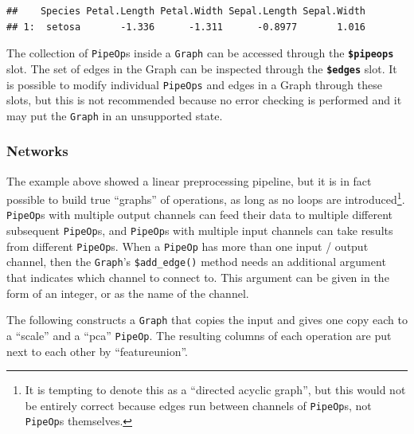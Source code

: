 \documentclass[]{scrbook}
\newenvironment{Shaded}{\begin{snugshade}}{\end{snugshade}}
\newcommand{\DecValTok}[1]{\textcolor[rgb]{0.00,0.00,0.81}{#1}}
\newcommand{\KeywordTok}[1]{\textcolor[rgb]{0.13,0.29,0.53}{\textbf{#1}}}
\newcommand{\NormalTok}[1]{#1}
\newcommand{\OperatorTok}[1]{\textcolor[rgb]{0.81,0.36,0.00}{\textbf{#1}}}
\renewenvironment{Shaded} {\begin{snugshade}\small} {\end{snugshade}}
\begin{document}
\begin{Shaded}
\end{Shaded}

\begin{verbatim}
##    Species Petal.Length Petal.Width Sepal.Length Sepal.Width
## 1:  setosa       -1.336      -1.311      -0.8977       1.016
\end{verbatim}

The collection of \texttt{PipeOp}s inside a \texttt{Graph} can be accessed through the \textbf{\texttt{\$pipeops}} slot.
The set of edges in the Graph can be inspected through the \textbf{\texttt{\$edges}} slot.
It is possible to modify individual \texttt{PipeOps} and edges in a Graph through these slots, but this is not recommended because no error checking is performed and it may put the \texttt{Graph} in an unsupported state.

\hypertarget{networks}{%
\subsubsection{Networks}\label{networks}}

The example above showed a linear preprocessing pipeline, but it is in fact possible to build true ``graphs'' of operations, as long as no loops are introduced\footnote{It is tempting to denote this as a ``directed acyclic graph'', but this would not be entirely correct because edges run between channels of \texttt{PipeOp}s, not \texttt{PipeOp}s themselves.}.
\texttt{PipeOp}s with multiple output channels can feed their data to multiple different subsequent \texttt{PipeOp}s, and \texttt{PipeOp}s with multiple input channels can take results from different \texttt{PipeOp}s.
When a \texttt{PipeOp} has more than one input / output channel, then the \texttt{Graph}'s \texttt{\$add\_edge()} method needs an additional argument that indicates which channel to connect to.
This argument can be given in the form of an integer, or as the name of the channel.

The following constructs a \texttt{Graph} that copies the input and gives one copy each to a ``scale'' and a ``pca'' \texttt{PipeOp}.
The resulting columns of each operation are put next to each other by ``featureunion''.
\end{document}
